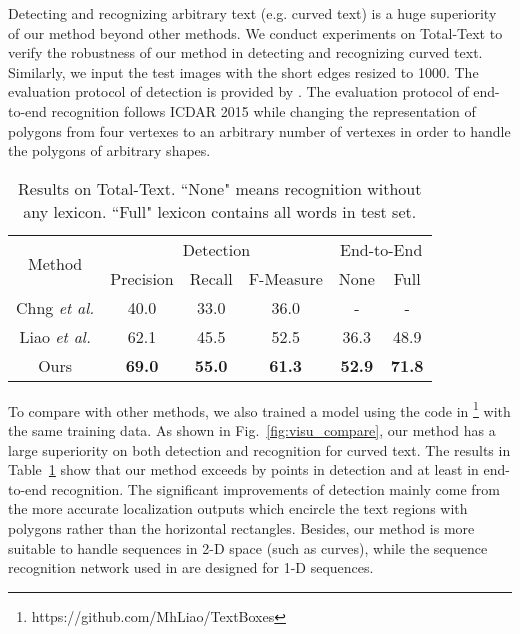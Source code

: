 \documentclass[runningheads]{llncs}
\begin{document}
Detecting and recognizing arbitrary text (e.g. curved text) is a huge superiority of our method beyond other methods. We conduct experiments on Total-Text to verify the robustness of our method in detecting and recognizing curved text. Similarly, we input the test images with the short edges resized to 1000.  The evaluation protocol of detection is provided by \cite{CK2017}.
The evaluation protocol of end-to-end recognition follows ICDAR 2015 while changing the representation of polygons from four vertexes to an arbitrary number of vertexes in order to handle the polygons of arbitrary shapes.

\begin{table}[!tp]
\begin{centering}
\caption{Results on Total-Text. ``None" means recognition without any lexicon. ``Full" lexicon contains all words in test set.}
\label{tab_total}
\begin{tabular}{|c|c|c|c|c|c|}
\hline 
\multirow{2}{*}{Method} & \multicolumn{3}{c|}{Detection} & \multicolumn{2}{c|}{End-to-End}\tabularnewline
\cline{2-6} 
 & Precision & Recall & F-Measure & None & Full\tabularnewline

\hline 
\hline
Chng \emph{et al.} \cite{CK2017} &40.0 &33.0 &36.0 &-  & - \tabularnewline
\hline
Liao \emph{et al.} \cite{liao2017textboxes} &62.1 &45.5  &52.5 & 36.3 & 48.9 \tabularnewline
\hline 
\hline 
Ours &\textbf{69.0} &\textbf{55.0}  &\textbf{61.3} &\textbf{52.9} &\textbf{71.8} \tabularnewline
\hline 
\end{tabular}
\par\end{centering}
\end{table}

To compare with other methods, we also trained a model \cite{liao2017textboxes} using the code in \cite{liao2017textboxes} \footnote{https://github.com/MhLiao/TextBoxes} 
with the same training data. As shown in Fig.~\ref{fig:visu_compare}, our method has a large superiority on both detection and recognition for curved text. The results in Table~\ref{tab_total} show that our method exceeds \cite{liao2017textboxes} by  points in detection and at least  in end-to-end recognition. The significant improvements of detection mainly come from the more accurate localization outputs which encircle the text regions with polygons rather than the horizontal rectangles. Besides, our method is more suitable to handle sequences in 2-D space (such as curves), while the sequence recognition network used in \cite{liao2017textboxes,Li_2017_ICCV,Busta_2017_ICCV} are designed for 1-D sequences.
\end{document}
